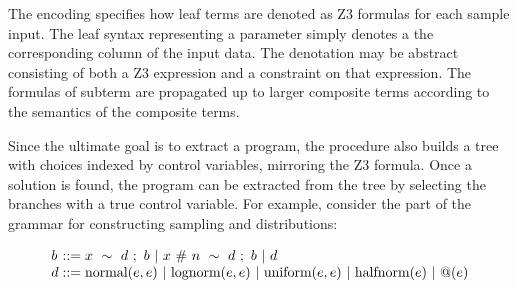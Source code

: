\documentclass[runningheads]{llncs}
\begin{document}
The encoding specifies how leaf terms are denoted as Z3 formulas for each sample input.
The leaf syntax representing a parameter simply denotes a the corresponding column of the input data. 
The denotation may be abstract consisting of both a Z3 expression and a constraint on that expression. 
The formulas of subterm are propagated up to larger composite terms according to the semantics of 
the composite terms.

Since the ultimate goal is to extract a program, the procedure also 
builds a tree with choices indexed by control variables, mirroring the Z3 formula.
Once a solution is found, the program can be extracted from the tree by selecting
the branches with a true control variable.
For example, consider the part of the grammar for constructing sampling and distributions:

\[
  \begin{array}{l @{} l}
    b &{} ::= x\ \sim\ d\ ;\ b \ |\ x\ \#\ n\ \sim\ d\ ;\ b \ |\ d \\ 
    d &{} ::= 
        \text{normal}(e, e) \ |\ 
        \text{lognorm}(e, e) \ |\ 
        \text{uniform}(e, e) \ |\ 
        \text{halfnorm}(e) \ |\ 
        @(e) \\ 
  \end{array}
\]
\end{document}
